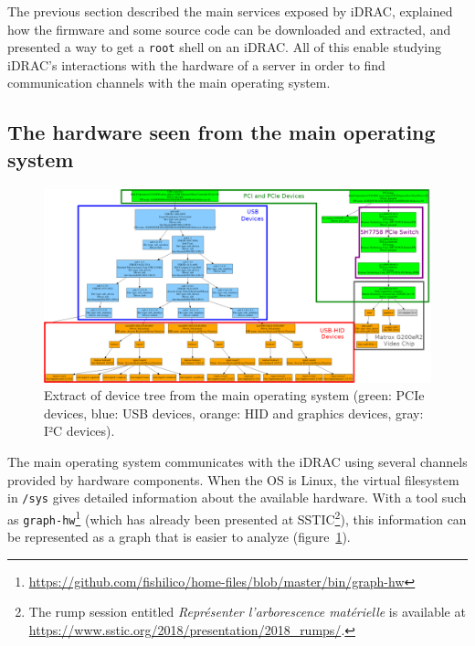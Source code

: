 The previous section described the main services exposed by iDRAC, explained how the firmware and some source code can be downloaded and extracted, and presented a way to get a \texttt{root} shell on an iDRAC.
All of this enable studying iDRAC's interactions with the hardware of a server in order to find communication channels with the main operating system.

\subsection{The hardware seen from the main operating system}
\label{sect:idrackar:hardware-from-os}

\begin{figure}[p]
  \centering
  \includegraphics[height=.74\textwidth,angle=90,origin=c]{03-idrackar/img/graph-hw_usb_pci_host.png}
  \caption{Extract of device tree from the main operating system (green: PCIe devices, blue: USB devices, orange: HID and graphics devices, gray: I²C devices).}
  \label{fig:idrackar:graph-hw-main-linux}
\end{figure}

The main operating system communicates with the iDRAC using several channels provided by hardware components.
When the OS is Linux, the virtual filesystem in \texttt{/sys} gives detailed information about the available hardware.
With a tool such as \texttt{graph-hw}\footnote{\url{https://github.com/fishilico/home-files/blob/master/bin/graph-hw}} (which has already been presented at SSTIC\footnote{The rump session entitled \emph{Représenter l'arborescence matérielle} is available at \url{https://www.sstic.org/2018/presentation/2018_rumps/}.}), this information can be represented as a graph that is easier to analyze (figure~\ref{fig:idrackar:graph-hw-main-linux}).

